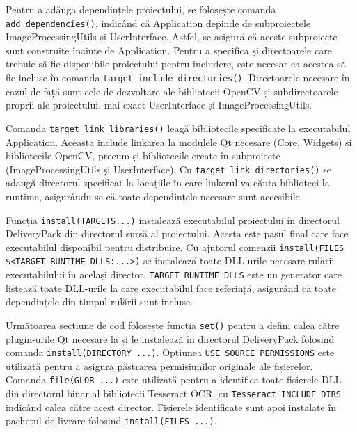 \documentclass[a4paper,12pt]{report}
\begin{document}
Pentru a adăuga dependințele proiectului, se folosește comanda \newline \texttt{add\_dependencies()}, indicând că Application depinde de subproiectele ImageProcessingUtils și UserInterface. Astfel, se asigură că aceste subproiecte sunt construite înainte de Application. Pentru a specifica și directoarele care trebuie să fie disponibile proiectului pentru includere, este necesar ca acestea să fie incluse în comanda \texttt{target\_include\_directories()}. Directoarele necesare în cazul de față sunt cele de dezvoltare ale bibliotecii OpenCV și subdirectoarele proprii ale proiectului, mai exact UserInterface și ImageProcessingUtils.

Comanda \texttt{target\_link\_libraries()} leagă bibliotecile specificate la executabilul Application. Aceasta include linkarea la modulele Qt necesare (Core, Widgets) și bibliotecile OpenCV, precum și bibliotecile create în subproiecte (ImageProcessingUtils și UserInterface). Cu \texttt{target\_link\_directories()} se adaugă directorul specificat la locațiile în care linkerul va căuta biblioteci la runtime, asigurându-se că toate dependințele necesare sunt accesibile.

Funcția \texttt{install(TARGETS...)} instalează executabilul proiectului în directorul DeliveryPack din directorul sursă al proiectului. Acesta este pasul final care face executabilul disponibil pentru distribuire. Cu ajutorul comenzii \newline \texttt{install(FILES \$<TARGET\_RUNTIME\_DLLS:...>)} se instalează toate DLL-urile necesare rulării executabilului în același director. \texttt{TARGET\_RUNTIME\_DLLS} este un generator care listează toate DLL-urile la care executabilul face referință, asigurând că toate dependințele din timpul rulării sunt incluse.

Următoarea secțiune de cod folosește funcția \texttt{set()} pentru a defini calea către plugin-urile Qt necesare la  și le instalează în directorul DeliveryPack folosind comanda \texttt{install(DIRECTORY ...)}. Opțiunea \newline \texttt{USE\_SOURCE\_PERMISSIONS} este utilizată pentru a asigura păstrarea permisiunilor originale ale fișierelor. Comanda \texttt{file(GLOB ...)} este utilizată pentru a identifica toate fișierele DLL din directorul binar al bibliotecii Tesseract OCR, cu \newline \texttt{Tesseract\_INCLUDE\_DIRS} indicând calea către acest director. Fișierele identificate sunt apoi instalate în pachetul de livrare folosind \texttt{install(FILES ...)}.
\end{document}

